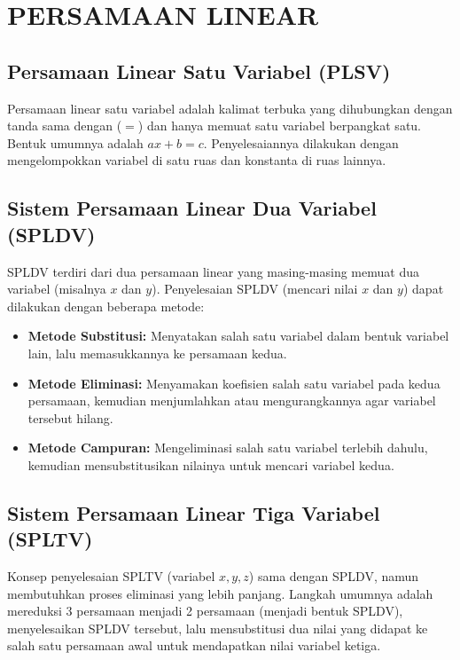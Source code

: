 \documentclass[12pt, a4paper]{article}
\begin{document}
\section{PERSAMAAN LINEAR}

\subsection{Persamaan Linear Satu Variabel (PLSV)}
Persamaan linear satu variabel adalah kalimat terbuka yang dihubungkan dengan tanda sama dengan ($=$) dan hanya memuat satu variabel berpangkat satu. Bentuk umumnya adalah $ax + b = c$. Penyelesaiannya dilakukan dengan mengelompokkan variabel di satu ruas dan konstanta di ruas lainnya.

\subsection{Sistem Persamaan Linear Dua Variabel (SPLDV)}
SPLDV terdiri dari dua persamaan linear yang masing-masing memuat dua variabel (misalnya $x$ dan $y$). Penyelesaian SPLDV (mencari nilai $x$ dan $y$) dapat dilakukan dengan beberapa metode:
\begin{itemize}
    \item \textbf{Metode Substitusi:} Menyatakan salah satu variabel dalam bentuk variabel lain, lalu memasukkannya ke persamaan kedua.
    \item \textbf{Metode Eliminasi:} Menyamakan koefisien salah satu variabel pada kedua persamaan, kemudian menjumlahkan atau mengurangkannya agar variabel tersebut hilang.
    \item \textbf{Metode Campuran:} Mengeliminasi salah satu variabel terlebih dahulu, kemudian mensubstitusikan nilainya untuk mencari variabel kedua.
\end{itemize}

\subsection{Sistem Persamaan Linear Tiga Variabel (SPLTV)}
Konsep penyelesaian SPLTV (variabel $x, y, z$) sama dengan SPLDV, namun membutuhkan proses eliminasi yang lebih panjang. Langkah umumnya adalah mereduksi 3 persamaan menjadi 2 persamaan (menjadi bentuk SPLDV), menyelesaikan SPLDV tersebut, lalu mensubstitusi dua nilai yang didapat ke salah satu persamaan awal untuk mendapatkan nilai variabel ketiga.
\end{document}
